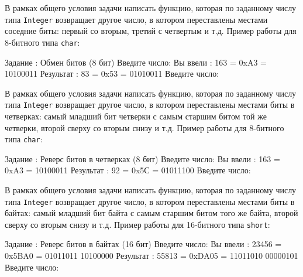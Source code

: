 
\begin{zztask}
В рамках общего условия задачи написать функцию, которая по заданному числу
типа \texttt{Integer} возвращает другое число, в котором переставлены
местами соседние биты: первый со вторым, третий с четвертым и т.д.
Пример работы для 8-битного типа \texttt{char}:
\begin{zzoutput}
  Задание \thezztask: Обмен битов (8 бит)
  Введите число: 
  Вы ввели  :  163 = 0xA3 = 10100011
  Результат :   83 = 0x53 = 01010011
  Введите число: \zzuser{ }
\end{zzoutput}
\end{zztask}


\begin{zztask}
В рамках общего условия задачи написать функцию, которая по заданному числу
типа \texttt{Integer} возвращает другое число, в котором переставлены
местами биты в четверках: самый младший бит четверки с самым старшим битом
той же четверки, второй сверху со вторым снизу и т.д.
Пример работы для 8-битного типа \texttt{char}:
\begin{zzoutput}
  Задание \thezztask: Реверс битов в четверках (8 бит)
  Введите число: 
  Вы ввели  :  163 = 0xA3 = 10100011
  Результат :   92 = 0x5С = 01011100
  Введите число: \zzuser{ }
\end{zzoutput}
\end{zztask}


\begin{zztask}
В рамках общего условия задачи написать функцию, которая по заданному числу
типа \texttt{Integer} возвращает другое число, в котором переставлены
местами биты в байтах: самый младший бит байта с самым старшим битом того
же байта, второй сверху со вторым снизу и т.д.
Пример работы для 16-битного типа \texttt{short}:
\begin{zzoutput}
  Задание \thezztask: Реверс битов в байтах (16 бит)
  Введите число: 
  Вы ввели  : 23456 = 0x5BA0 = 01011011 10100000
  Результат : 55813 = 0xDA05 = 11011010 00000101
  Введите число: \zzuser{ }
\end{zzoutput}
\end{zztask}

